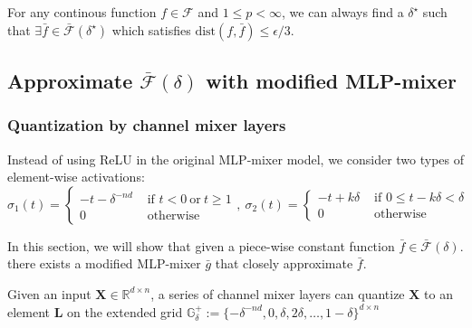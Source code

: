 \begin{lemma}  \label{section:uniform_approx_step_1}
For any continous function $f\in\mathcal{F}$ and $1\leq p < \infty$, we can always find a $\delta^\star$ such that $\exists \bar{f} \in \bar{\mathcal{F}}(\delta^\star)$ which satisfies $\text{dist}(f, \bar{f}) \leq \epsilon /3 $.
\end{lemma}

\subsection{Approximate $\bar{\mathcal{F}}(\delta)$ with modified MLP-mixer}


\subsubsection{Quantization by channel mixer layers}

Instead of using ReLU in the original MLP-mixer model, we consider two types of element-wise activations:
\begin{equation*}
    \sigma_1(t) = \begin{cases}
-t - \delta ^{-nd} & \text{ if } t < 0~\text{or}~t \geq 1 \\ 
0 & \text{ otherwise } 
\end{cases},~
\sigma_2(t) = \begin{cases}
-t+k\delta  & \text{ if } 0 \leq t-k\delta < \delta \\ 
0 & \text{ otherwise } 
\end{cases}
\end{equation*}


In this section, we will show that given a piece-wise constant function $\bar{f} \in \bar{\mathcal{F}}(\delta)$. there exists a modified MLP-mixer $\bar{g}$ that closely approximate $\bar{f}$.

Given an input $\mathbf{X} \in \mathbb{R}^{d\times n}$, a series of channel mixer layers can quantize $\mathbf{X}$ to an element $\mathbf{L}$ on the extended grid $\mathbb{G}_\delta^+ := \{-\delta^{-nd}, 0, \delta, 2\delta,\ldots, 1-\delta\}^{d\times n}$


